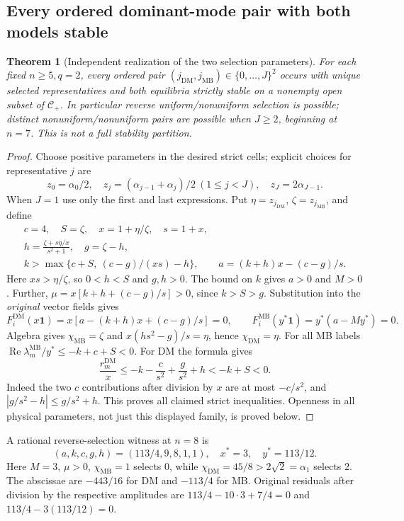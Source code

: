 \documentclass[11pt]{article}
\newcommand{\one}{\mathbf{1}}
\newcommand{\DM}{\mathrm{DM}}
\newcommand{\MB}{\mathrm{MB}}
\DeclareMathOperator{\Ree}{Re}
\newtheorem{theorem}{Theorem}[section]
\theoremstyle{definition}
\theoremstyle{remark}
\begin{document}
\subsection{Every ordered dominant-mode pair with both models stable}
\begin{theorem}[Independent realization of the two selection parameters]
\label{thm:P08-pair-realization}
For each fixed $n\ge5,q=2$, every ordered pair
$(j_{\DM},j_{\MB})\in\{0,\ldots,J\}^2$ occurs with unique selected
representatives and both equilibria strictly stable on a nonempty open
subset of $\mathcal C_+$. In particular reverse uniform/nonuniform
selection is possible; distinct nonuniform/nonuniform pairs are possible
when $J\ge2$, beginning at $n=7$. This is not a full stability partition.
\end{theorem}
\begin{proof}
Choose positive parameters in the desired strict cells; explicit choices
for representative $j$ are
\[
 z_0=\alpha_0/2,\quad
 z_j=(\alpha_{j-1}+\alpha_j)/2\ (1\le j<J),\quad
 z_J=2\alpha_{J-1}.
\]
When $J=1$ use only the first and last expressions. Put
$\eta=z_{j_{\DM}}$, $\zeta=z_{j_{\MB}}$, and define
\begin{equation}
\begin{gathered}
 c=4,\quad S=\zeta,\quad x=1+\eta/\zeta,\quad s=1+x,\\
 h=\frac{\zeta+s\eta/x}{s^2+1},\quad g=\zeta-h,\\
 k>\max\{c+S,\ (c-g)/(xs)-h\},\qquad
 a=(k+h)x-(c-g)/s.
\end{gathered}\label{eq:P08-pair-construction}
\end{equation}
Here $xs>\eta/\zeta$, so $0<h<S$ and $g,h>0$. The bound on $k$
gives $a>0$ and $M>0$. Further,
$\mu=x[k+h+(c-g)/s]>0$, since $k>S>g$. Substitution into the
\emph{original} vector fields gives
\begin{equation}
 F_i^{\DM}(x\one)=x[a-(k+h)x+(c-g)/s]=0,\qquad
 F_i^{\MB}(y^*\one)=y^*(a-My^*)=0.
 \label{eq:P08-residual-general}
\end{equation}
Algebra gives $\chi_{\MB}=\zeta$ and
$x(hs^2-g)/s=\eta$, hence $\chi_{\DM}=\eta$.
For all MB labels $\Ree\lambda_m^{\MB}/y^*\le-k+c+S<0$.
For DM the formula gives
\begin{equation}
 \frac{r_m^{\DM}}x
 \le-k-\frac{c}{s^2}+\frac{g}{s^2}+h<-k+S<0.
 \label{eq:P08-DM-bound}
\end{equation}
Indeed the two $c$ contributions after division by $x$ are at most
$-c/s^2$, and $|g/s^2-h|\le g/s^2+h$. This proves all claimed
strict inequalities. Openness in all physical parameters, not just this
displayed family, is proved below.
\end{proof}
A rational reverse-selection witness at $n=8$ is
\begin{equation}
 (a,k,c,g,h)=(113/4,9,8,1,1),\quad x^*=3,\quad y^*=113/12.
 \label{eq:P08-reverse-selection-example}
\end{equation}
Here $M=3$, $\mu>0$, $\chi_{\MB}=1$ selects $0$, while
$\chi_{\DM}=45/8>2\sqrt2=\alpha_1$ selects $2$.
The abscissae are $-443/16$ for DM and $-113/4$ for MB.
Original residuals after division by the respective amplitudes are
$113/4-10\cdot3+7/4=0$ and $113/4-3(113/12)=0$.
\end{document}
